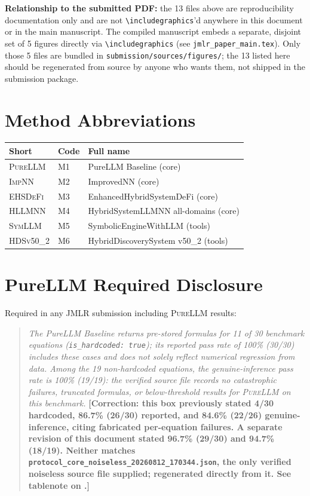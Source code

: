\documentclass[twoside,11pt]{article}
\newcommand{\PureLLM}{\textsc{PureLLM}}
\newcommand{\INN}{\textsc{ImpNN}}
\newcommand{\EHD}{\textsc{EHSDeFi}}
\newcommand{\HSL}{\textsc{HLLMNN}}
\newcommand{\SEL}{\textsc{SymLLM}}
\newcommand{\HDS}{\textsc{HDSv50\_2}}
\begin{document}
\noindent\textbf{Relationship to the submitted PDF:} the 13 files
above are reproducibility documentation only and are not
\verb|\includegraphics|'d anywhere in this document or in the main
manuscript. The compiled manuscript embeds a separate, disjoint set
of 5 figures directly via \verb|\includegraphics| (see
\texttt{jmlr\_paper\_main.tex}). Only those 5 files are bundled in
\texttt{submission/sources/figures/}; the 13 listed here should be
regenerated from source by anyone who wants them, not shipped in the
submission package.

\section{Method Abbreviations}
\label{app:abbrev}

\begin{tabular}{L{1.8cm} L{2.5cm} L{6.0cm}}
\toprule
\textbf{Short} & \textbf{Code} & \textbf{Full name}\\
\midrule
\PureLLM & M1 & PureLLM Baseline (core)\\
\INN     & M2 & ImprovedNN (core)\\
\EHD     & M3 & EnhancedHybridSystemDeFi (core)\\
\HSL     & M4 & HybridSystemLLMNN all-domains (core)\\
\SEL     & M5 & SymbolicEngineWithLLM (tools)\\
\HDS     & M6 & HybridDiscoverySystem v50\_2 (tools)\\
\bottomrule
\end{tabular}

\section{PureLLM Required Disclosure}
\label{app:disclosure}

Required in any JMLR submission including \PureLLM{} results:

\begin{quote}
\textit{The PureLLM Baseline returns pre-stored formulas for 11 of 30
benchmark equations (\texttt{is\_hardcoded: true}); its reported pass rate
of 100\% (30/30) includes these cases and does not solely reflect
numerical regression from data.  Among the 19 non-hardcoded equations,
the genuine-inference pass rate is 100\% (19/19): the verified source
file records no catastrophic failures, truncated formulas, or
below-threshold results for \PureLLM{} on this benchmark.}
\textbf{[Correction: this box previously stated 4/30 hardcoded, 86.7\%
(26/30) reported, and 84.6\% (22/26) genuine-inference, citing fabricated
per-equation failures. A separate revision of this document stated
96.7\% (29/30) and 94.7\% (18/19). Neither matches
\texttt{protocol\_core\_noiseless\_20260812\_170344.json}, the only
verified noiseless source file supplied; regenerated directly from it.
See tablenote on .]}
\end{quote}
\end{document}

